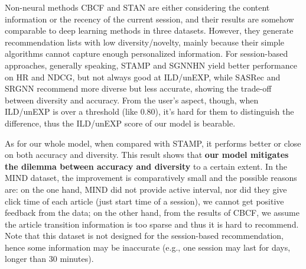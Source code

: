 Non-neural methods CBCF and STAN are either considering the content 
information or the recency of the current session, and their results are somehow 
comparable to deep learning methods in three datasets. However, they generate recommendation lists with low diversity/novelty, mainly because their simple algorithms cannot capture enough personalized information. For session-based approaches, generally speaking, STAMP and SGNNHN yield better performance on HR and NDCG, but not always good at ILD/unEXP, while SASRec and SRGNN recommend more diverse but less accurate, showing the trade-off between diversity and accuracy. From the user's aspect, though, when ILD/unEXP is over a threshold (like 0.80), it's hard for them to distinguish the difference, thus the ILD/unEXP score of our model is bearable. 

As for our whole model, when compared with STAMP, it performs better or close on both accuracy and diversity. This result shows that \textbf{our model mitigates the dilemma between accuracy and diversity} 
to a certain extent. In the MIND dataset, 
the improvement is comparatively small and the possible reasons are: 
on the one hand, MIND did not provide active interval, nor did they give click time of each article (just start time of a session), 
we cannot get positive feedback from the data; on the other hand, from the results of CBCF, 
we assume the article transition information is too sparse and thus it is hard to recommend. 
Note that this dataset is not designed for the session-based recommendation, hence some information 
may be inaccurate (e.g., one session may last for days, longer than 30 minutes).

